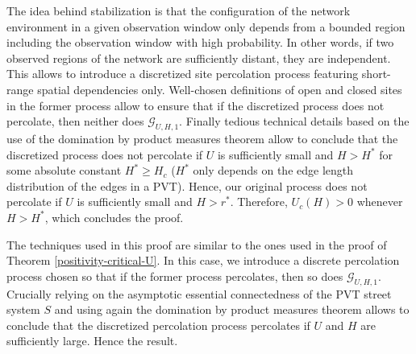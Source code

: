 \documentclass[conference]{IEEEtran}
\begin{document}
\begin{IEEEproof}
The idea behind stabilization is that the configuration of the network environment in a given observation window only depends from a bounded region including the observation window with high probability. In other words, if two observed regions of the network are sufficiently distant, they are independent. This allows to introduce a discretized site percolation process featuring short-range spatial dependencies only. Well-chosen definitions of open and closed sites in the former process allow to ensure that if the discretized process does not percolate, then neither does $\mathcal{G}_{U,H,1}$. Finally tedious technical details based on the use of the domination by product measures theorem \cite{liggett1997domination} allow to conclude that the discretized process does not percolate if $U$ is sufficiently small and $H > H^{*}$ for some absolute constant $H^{*}\geq H_c$ ($H^{*}$ only depends on the edge length distribution of the edges in a PVT). Hence, our original process does not percolate if $U$ is sufficiently small and $H > r^{*}$. Therefore, $U_{c}(H) > 0$ whenever $H > H^{*}$, which concludes the proof.
\end{IEEEproof}

\vspace{1\baselineskip}

\begin{IEEEproof}
The techniques used in this proof are similar to the ones used in the proof of Theorem \ref{positivity-critical-U}. In this case, we introduce a discrete percolation process chosen so that if the former process percolates, then so does $\mathcal{G}_{U,H,1}$. Crucially relying on the asymptotic essential connectedness \cite{hirsch_continuum_2017} of the PVT street system $S$ and using again the domination by product measures theorem \cite{liggett1997domination} allows to conclude that the discretized percolation process percolates if $U$ and $H$ are sufficiently large. Hence the result.
\end{IEEEproof}

\vspace{1\baselineskip}
\end{document}
